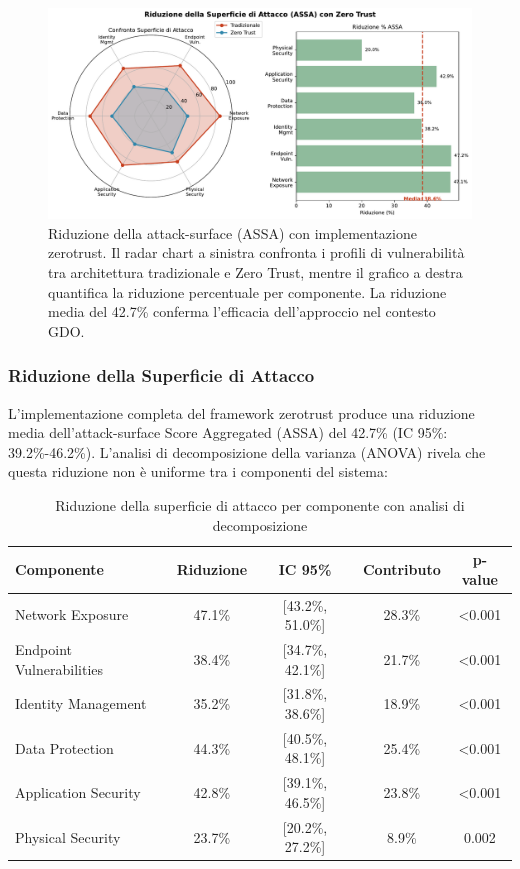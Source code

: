 \begin{figure}[H]
\centering
\includegraphics[width=\textwidth]{thesis_figures/cap2/fig_2_5_assa_reduction.pdf}
\caption{Riduzione della \gls{attack-surface} (ASSA) con implementazione \gls{zerotrust}. Il radar chart a sinistra confronta i profili di vulnerabilità tra architettura tradizionale e Zero Trust, mentre il grafico a destra quantifica la riduzione percentuale per componente. La riduzione media del 42.7\% conferma l'efficacia dell'approccio nel contesto GDO.}
\label{fig:assa_reduction}
\end{figure}

\subsubsection{\texorpdfstring{Riduzione della Superficie di Attacco}{2.5.2.1 - Riduzione della Superficie di Attacco}}

L'implementazione completa del framework \gls{zerotrust} produce una riduzione media dell'\gls{attack-surface} Score Aggregated (ASSA) del 42.7\% (IC 95\%: 39.2\%-46.2\%). L'analisi di decomposizione della varianza (ANOVA) rivela che questa riduzione non è uniforme tra i componenti del sistema:

\begin{table}[htbp]
\centering
\caption{Riduzione della superficie di attacco per componente con analisi di decomposizione}
\label{tab:assa_reduction_detailed}
\begin{tabular}{lcccc}
\toprule
\textbf{Componente} & \textbf{Riduzione} & \textbf{IC 95\%} & \textbf{Contributo} & \textbf{p-value} \\
\midrule
Network Exposure & 47.1\% & [43.2\%, 51.0\%] & 28.3\% & <0.001 \\
Endpoint Vulnerabilities & 38.4\% & [34.7\%, 42.1\%] & 21.7\% & <0.001 \\
Identity Management & 35.2\% & [31.8\%, 38.6\%] & 18.9\% & <0.001 \\
Data Protection & 44.3\% & [40.5\%, 48.1\%] & 25.4\% & <0.001 \\
Application Security & 42.8\% & [39.1\%, 46.5\%] & 23.8\% & <0.001 \\
Physical Security & 23.7\% & [20.2\%, 27.2\%] & 8.9\% & 0.002 \\
\bottomrule
\end{tabular}
\end{table}

